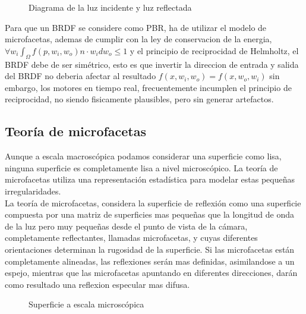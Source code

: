 \begin{figure}[H]
    \vspace{0.5cm}
    \centering
    \caption{Diagrama de la luz incidente y luz reflectada}
    \vspace{0.5cm}
\end{figure}

Para que un BRDF se considere como PBR, ha de utilizar el modelo de microfacetas, ademas de cumplir con la ley de conservacion
de la energia, $\forall w_i \int_{\Omega} f(p, w_i, w_o) n\cdot{w_i} dw_o \leq 1$ y el principio de reciprocidad de Helmholtz,
el BRDF debe de ser simétrico, esto es que invertir la direccion de entrada y salida del BRDF no deberia afectar al resultado
$f(x, w_i, w_o) = f(x, w_o, w_i)$ sin embargo, los motores en tiempo real, frecuentemente incumplen el principio de reciprocidad,
no siendo fisicamente plausibles, pero sin generar artefactos.\\

    \subsection{Teor\'ia de microfacetas}

    \bgroup

        Aunque a escala macrosc\'opica podamos considerar una superficie como lisa, ninguna superficie es completamente lisa a nivel
        microsc\'opico. La teor\'ia de microfacetas utiliza una representaci\'on estad\'istica para modelar estas peque\~nas irregularidades.\\

        La teor\'ia de microfacetas, considera la superficie de reflexi\'on como una superficie compuesta por una matriz de
        superficies mas peque\~nas que la longitud de onda de la luz pero muy peque\~nas desde el punto de vista de la c\'amara,
        completamente reflectantes, llamadas microfacetas, y cuyas diferentes orientaciones determinan la rugosidad de la superficie.
        Si las microfacetas est\'an completamente alineadas, las reflexiones ser\'an mas definidas, asimilandose a un espejo, mientras
        que las microfacetas apuntando en diferentes direcciones, dar\'an como resultado una reflexion especular mas difusa.

        \begin{figure}[H]
            \vspace{0.5cm}
            \centering
            \caption{Superficie a escala microsc\'opica}
            \vspace{0.5cm}
        \end{figure}

